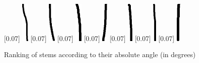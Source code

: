 \begin{figure}[h!]
{  }
  [0.07\linewidth]{
    \includegraphics[height=2cm,keepaspectratio]{gfx/implementation/stem-angle/3889.png}
  }
  [0.07\linewidth]{
    \includegraphics[height=2cm,keepaspectratio]{gfx/implementation/stem-angle/5380.png}
  }
  [0.07\linewidth]{
    \includegraphics[height=2cm,keepaspectratio]{gfx/implementation/stem-angle/4194.png}
  }
  [0.07\linewidth]{
    \includegraphics[height=2cm,keepaspectratio]{gfx/implementation/stem-angle/3970.png}
  }
  [0.07\linewidth]{
    \includegraphics[height=2cm,keepaspectratio]{gfx/implementation/stem-angle/4783.png}
  }
  [0.07\linewidth]{
    \includegraphics[height=2cm,keepaspectratio]{gfx/implementation/stem-angle/3920.png}
  }
  [0.07\linewidth]{
    \includegraphics[height=2cm,keepaspectratio]{gfx/implementation/stem-angle/5368.png}
  }

  \caption{Ranking of stems according to their absolute angle (in degrees)}
  \label{fig:stem-angle-ranking}
\end{figure}

